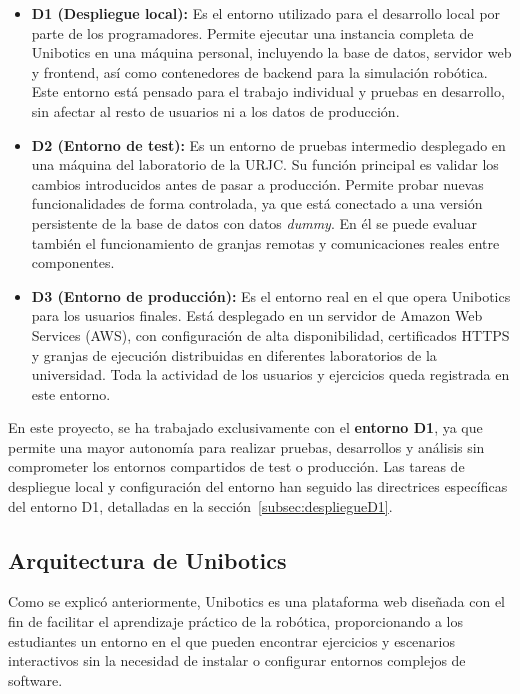 \documentclass[a4paper, 12pt]{book}
\begin{document}
\begin{itemize}
    \item \textbf{D1 (Despliegue local):} Es el entorno utilizado para el desarrollo local por parte de los programadores. Permite ejecutar una instancia completa de Unibotics en una máquina personal, incluyendo la base de datos, servidor web y frontend, así como contenedores de backend para la simulación robótica. Este entorno está pensado para el trabajo individual y pruebas en desarrollo, sin afectar al resto de usuarios ni a los datos de producción.

    \item \textbf{D2 (Entorno de test):} Es un entorno de pruebas intermedio desplegado en una máquina del laboratorio de la URJC. Su función principal es validar los cambios introducidos antes de pasar a producción. Permite probar nuevas funcionalidades de forma controlada, ya que está conectado a una versión persistente de la base de datos con datos \textit{dummy}. En él se puede evaluar también el funcionamiento de granjas remotas y comunicaciones reales entre componentes.

    \item \textbf{D3 (Entorno de producción):} Es el entorno real en el que opera Unibotics para los usuarios finales. Está desplegado en un servidor de Amazon Web Services (AWS), con configuración de alta disponibilidad, certificados HTTPS y granjas de ejecución distribuidas en diferentes laboratorios de la universidad. Toda la actividad de los usuarios y ejercicios queda registrada en este entorno.
\end{itemize}

En este proyecto, se ha trabajado exclusivamente con el \textbf{entorno D1}, ya que permite una mayor autonomía para realizar pruebas, desarrollos y análisis sin comprometer los entornos compartidos de test o producción. Las tareas de despliegue local y configuración del entorno han seguido las directrices específicas del entorno D1, detalladas en la sección~\ref{subsec:despliegueD1}.



\subsection{Arquitectura de Unibotics}
\label{subsec:arquitecturaunibotics}

Como se explicó anteriormente, Unibotics es una plataforma web diseñada con el fin de facilitar el aprendizaje práctico de la robótica, proporcionando a los estudiantes un entorno en el que pueden encontrar ejercicios y escenarios interactivos sin la necesidad de instalar o configurar entornos complejos de software.
\end{document}
